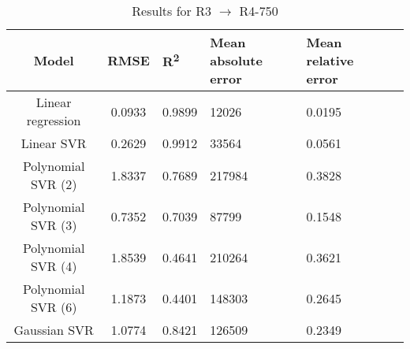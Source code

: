 \begin{table}[H]
\centering
\begin{adjustbox}{center}
\begin{tabular}{c | c M{1.2cm} M{2.5cm} M{2.5cm} M{1.8cm}}
Model & RMSE & R\textsuperscript{2} & Mean absolute error & Mean relative error \tabularnewline
\hline
Linear regression & 0.0933 & 0.9899 &  12026 & 0.0195 \\
Linear SVR & 0.2629 & 0.9912 &  33564 & 0.0561 \\
Polynomial SVR (2) & 1.8337 & 0.7689 & 217984 & 0.3828 \\
Polynomial SVR (3) & 0.7352 & 0.7039 &  87799 & 0.1548 \\
Polynomial SVR (4) & 1.8539 & 0.4641 & 210264 & 0.3621 \\
Polynomial SVR (6) & 1.1873 & 0.4401 & 148303 & 0.2645 \\
Gaussian SVR & 1.0774 & 0.8421 & 126509 & 0.2349 \\
\end{tabular}
\end{adjustbox}
\\
\caption{Results for R3 $\rightarrow$ R4-750}
\label{tab:coreonly_linear_R3_R4_750}
\end{table}
